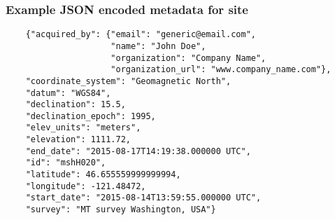 \documentclass{article}
\begin{document}
\subsubsection{Example JSON encoded metadata for \textbf{site}}
\begin{verbatim}
	{"acquired_by": {"email": "generic@email.com",
	                 "name": "John Doe",
	                 "organization": "Company Name",
	                 "organization_url": "www.company_name.com"},
	"coordinate_system": "Geomagnetic North",
	"datum": "WGS84",
	"declination": 15.5,
	"declination_epoch": 1995,
	"elev_units": "meters",
	"elevation": 1111.72,
	"end_date": "2015-08-17T14:19:38.000000 UTC",
	"id": "mshH020",
	"latitude": 46.655559999999994,
	"longitude": -121.48472,
	"start_date": "2015-08-14T13:59:55.000000 UTC",
	"survey": "MT survey Washington, USA"}
\end{verbatim}
\end{document}
